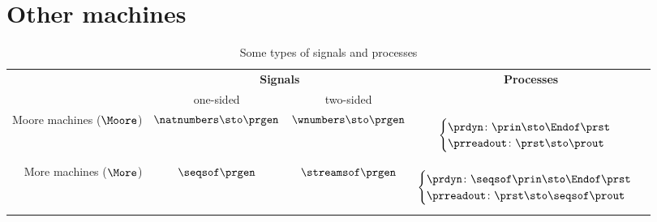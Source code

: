 \section{Other machines}

\begin{table*}[b]
    \caption{Some types of signals and processes}
    \label{tab:processes-types}
    \begin{tabular}{rccc}
        & \multicolumn{2}{c}{\textbf{Signals}} & \textbf{Processes} \\
        & \rule{0pt}{10pt} one-sided & two-sided & \\
        Moore machines ($\Moore$) &
        $\natnumbers \sto \prgen$
        &
        $\wnumbers \sto \prgen$
        &
        \begin{minipage}{4cm}
            \raggedright
            \begin{equation*}
                \begin{cases}
                    \prdyn \colon \prin \sto \Endof \prst \\
                    \prreadout \colon \prst \sto \prout
                \end{cases}
            \end{equation*}
        \end{minipage}
        \\

        More machines ($\More$) & $\seqsof \prgen$ & $\streamsof \prgen$
        &
        \begin{minipage}{4cm}
            \raggedright
            \begin{equation*}
                \begin{cases}
                    \prdyn \colon \seqsof \prin \sto \Endof \prst \\
                    \prreadout \colon \prst \sto \seqsof \prout
                \end{cases}
            \end{equation*}


\end{minipage}
\end{tabular}
\end{table*}
